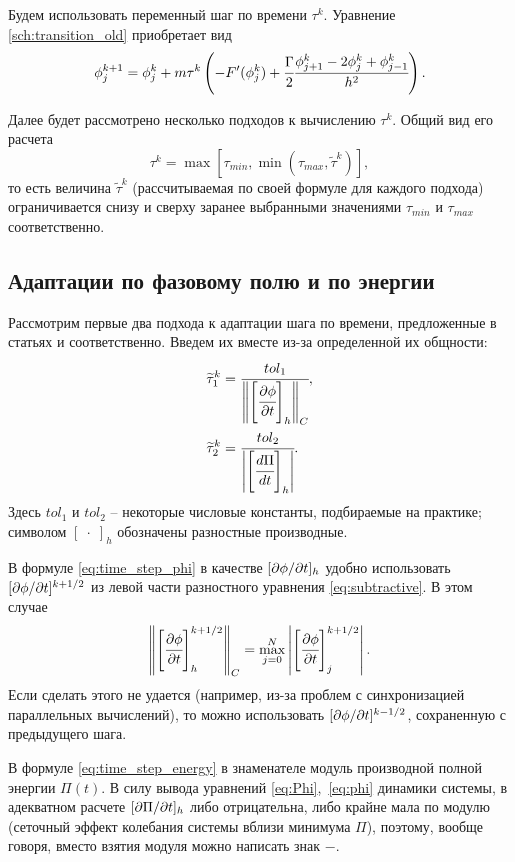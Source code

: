 Будем использовать переменный шаг по времени $\tau^k$. Уравнение \ref{sch:transition_old} приобретает вид
\begin{equation}
	\phi_j^{k + 1} = \phi_j^k + m \tau^k \left( -F'(\phi_j^k) + \cfrac{\Gamma}{2} \cfrac{{\phi}_{j + 1}^k - 2 {\phi}_j^k + {\phi}_{j - 1}^k}{h^2} \right).
	\label{sch:transition}
\end{equation}

Далее будет рассмотрено несколько подходов к вычислению $\tau^k$. Общий вид его расчета
\[
	\tau^k = \max \left[ \tau_{min}, \min( \tau_{max}, \widetilde{\tau}^k) \right],
\]
то есть величина $\widetilde{\tau}^k$ (рассчитываемая по своей формуле для каждого подхода) ограничивается снизу и сверху заранее выбранными значениями $\tau_{min}$ и $\tau_{max}$ соответственно.


\subsection{Адаптации по фазовому полю и по энергии}

Рассмотрим первые два подхода к адаптации шага по времени, предложенные в статьях \cite{li_time_step} и \cite{zhang_time_step} соответственно. Введем их вместе из-за определенной их общности:
\begin{align}
	\widetilde{\tau}_1^k & = \cfrac{tol_1}{\left\| \left[ \cfrac{\partial \phi}{\partial t} \right]_h \right\|_C},
	\label{eq:time_step_phi} \\
	\widetilde{\tau}_2^k & = \cfrac{tol_2}{\left| \left[ \cfrac{d \Pi}{dt} \right]_h \right|}.
	\label{eq:time_step_energy}
\end{align}
Здесь $tol_1$ и $tol_2$ -- некоторые числовые константы, подбираемые на практике; символом $[\; \cdot \;]_h$ обозначены разностные производные.

В формуле \eqref{eq:time_step_phi} в качестве $[\partial \phi / \partial t]_h$ удобно использовать $[\partial \phi / \partial t]^{k + 1/2}$ из левой части разностного уравнения \eqref{eq:subtractive}. В этом случае
\[
	\left\| \left[ \cfrac{\partial \phi}{\partial t} \right]_h^{k + 1/2} \right\|_C = \max\limits_{j = 0}^N \left| \left[ \cfrac{\partial \phi}{\partial t} \right]_j^{k + 1/2} \right|.
\]
Если сделать этого не удается (например, из-за проблем с синхронизацией параллельных вычислений), то можно использовать $[\partial \phi / \partial t]^{k - 1/2}$, сохраненную с предыдущего шага.

В формуле \eqref{eq:time_step_energy} в знаменателе модуль производной полной энергии $\Pi(t)$. В силу вывода уравнений \eqref{eq:Phi},~\eqref{eq:phi} динамики системы, в адекватном расчете $[\partial \Pi / \partial t]_h$ либо отрицательна, либо крайне мала по модулю (сеточный эффект колебания системы вблизи минимума $\Pi$), поэтому, вообще говоря, вместо взятия модуля можно написать знак $-$.

